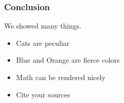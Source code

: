 \begin{frame}
  \frametitle{Conclusion}
        We showed many things.
        \begin{itemize}
                \item Cats are peculiar
                \item Blue and Orange are fierce colors
                \item Math can be rendered nicely
                \item Cite your sources
        \end{itemize}
\end{frame}
